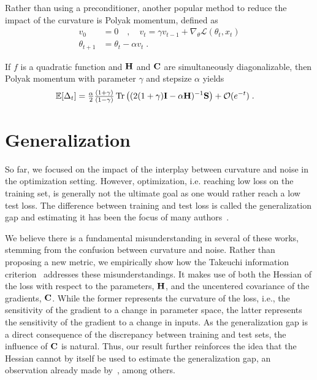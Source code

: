 Rather than using a preconditioner, another popular method to reduce the impact of the curvature is Polyak momentum, defined as
\begin{align*}
    v_0 &=0 \quad , \quad v_t = \gamma v_{t-1} + \nabla_\theta \mathcal{L}(\theta_t, x_t)\\
    \theta_{t+1}    &= \theta_t - \alpha v_t \; .
\end{align*}

\begin{proposition}
\label{prop:polyak_limit}
If $f$ is a quadratic function and ${\mathbf{H}}$ and ${\mathbf{C}}$ are simultaneously diagonalizable, then Polyak momentum with parameter $\gamma$ and stepsize $\alpha$ yields
\begin{align}
    \mathbb{E}[\Delta_t]    &= \tfrac{\alpha}{2} \tfrac{(1 + \gamma)}{(1 - \gamma)} \operatorname{Tr} \left((2 (1 + \gamma) {\mathbf{I}} - \alpha {\mathbf{H}})^{-1} {\mathbf{S}} \right) + {\mathcal{O}}(e^{-t}) \; .
\end{align}
\end{proposition}

\section{Generalization}
So far, we focused on the impact of the interplay between curvature and noise in the optimization setting. However, optimization, i.e. reaching low loss on the training set, is generally not the ultimate goal as one would rather reach a low test loss. The difference between training and test loss is called the generalization gap and estimating it has been the focus of many authors~\citep{keskar2016large, neyshabur2017exploring, liang2017fisher, novak2018sensitivity, rangamani2019scale}.

We believe there is a fundamental misunderstanding in several of these works, stemming from the confusion between curvature and noise. Rather than proposing a new metric, we empirically show how the Takeuchi information criterion~\citep[TIC:][]{takeuchi1976distribution} addresses these misunderstandings. It makes use of both the Hessian of the loss with respect to the parameters, ${\mathbf{H}}$, and the uncentered covariance of the gradients, ${\mathbf{C}}$. While the former represents the curvature of the loss, i.e., the sensitivity of the gradient to a change in parameter space, the latter represents the sensitivity of the gradient to a change in inputs. As the generalization gap is a direct consequence of the discrepancy between training and test sets, the influence of ${\mathbf{C}}$ is natural. Thus, our result further reinforces the idea that the Hessian cannot by itself be used to estimate the generalization gap, an observation already made by~\citet{dinh2017sharp}, among others.

